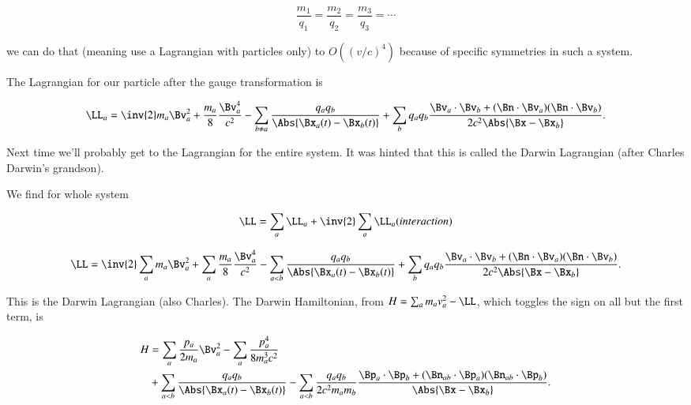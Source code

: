 \begin{equation}\label{eqn:relativisticElectrodynamicsL26:10}
\frac{m_1}{q_1} = \frac{m_2}{q_2} = \frac{m_3}{q_3} = \cdots
\end{equation}

we can do that (meaning use a Lagrangian with particles only) to $O((v/c)^4)$ because of specific symmetries in such a system.

The Lagrangian for our particle after the gauge transformation is

\begin{equation}\label{eqn:relativisticElectrodynamicsL26:30}
\LL_a = \inv{2} m_a \Bv_a^2 + \frac{m_a}{8} \frac{\Bv_a^4}{c^2} 
-\sum_{b \ne a} \frac{q_a q_b}{\Abs{\Bx_a(t) - \Bx_b(t)}}
+\sum_b q_a q_b \frac{\Bv_a \cdot \Bv_b + (\Bn \cdot \Bv_a) (\Bn \cdot \Bv_b)}{2 c^2 \Abs{\Bx - \Bx_b} }.
\end{equation}

Next time we'll probably get to the Lagrangian for the entire system.  It was hinted that this is called the Darwin Lagrangian (after Charles Darwin's grandson).

We find for whole system

\begin{equation}\label{eqn:relativisticElectrodynamicsL26:50}
\LL =  \sum_a \LL_a + \inv{2} \sum_a \LL_a (interaction)
\end{equation}

\begin{equation}\label{eqn:relativisticElectrodynamicsL26:70}
\LL = \inv{2} \sum_a m_a \Bv_a^2 + \sum_a \frac{m_a}{8} \frac{\Bv_a^4}{c^2} 
-\sum_{ a < b} \frac{q_a q_b}{\Abs{\Bx_a(t) - \Bx_b(t)}}
+\sum_b q_a q_b \frac{\Bv_a \cdot \Bv_b + (\Bn \cdot \Bv_a) (\Bn \cdot \Bv_b)}{2 c^2 \Abs{\Bx - \Bx_b} }.
\end{equation}

This is the Darwin Lagrangian (also Charles).  The Darwin Hamiltonian, from $H = \sum_a m_a v_a^2 - \LL$, which toggles the sign on all but the first term, is

\begin{equation}\label{eqn:relativisticElectrodynamicsL26:90}
\begin{aligned}
H &= \sum_a \frac{p_a}{2 m_a} \Bv_a^2 - \sum_a \frac{p_a^4}{8 m_a^3 c^2}  \\
&+\sum_{ a < b} \frac{q_a q_b}{\Abs{\Bx_a(t) - \Bx_b(t)}}
- \sum_{ a < b } \frac{q_a q_b}{ 2 c^2 m_a m_b } \frac{\Bp_a \cdot \Bp_b + (\Bn_{a b} \cdot \Bp_a) (\Bn_{ a b } \cdot \Bp_b)}{\Abs{\Bx - \Bx_b} }.
\end{aligned}
\end{equation}

